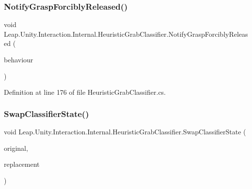 \mbox{\label{class_leap_1_1_unity_1_1_interaction_1_1_internal_1_1_heuristic_grab_classifier_a9c2b9020038d2087dd78e9c4ccdbfcdb}} 
\subsubsection{\texorpdfstring{NotifyGraspForciblyReleased()}{NotifyGraspForciblyReleased()}}
{\footnotesize\ttfamily void Leap.\+Unity.\+Interaction.\+Internal.\+Heuristic\+Grab\+Classifier.\+Notify\+Grasp\+Forcibly\+Released (\begin{DoxyParamCaption}\item[{\mbox{\hyperlink{interface_leap_1_1_unity_1_1_interaction_1_1_i_interaction_behaviour}{I\+Interaction\+Behaviour}}}]{behaviour }\end{DoxyParamCaption})}



Definition at line 176 of file Heuristic\+Grab\+Classifier.\+cs.

\mbox{\label{class_leap_1_1_unity_1_1_interaction_1_1_internal_1_1_heuristic_grab_classifier_a475f3bc02d1c3649d24ee266e2221c3b}} 
\subsubsection{\texorpdfstring{SwapClassifierState()}{SwapClassifierState()}}
{\footnotesize\ttfamily void Leap.\+Unity.\+Interaction.\+Internal.\+Heuristic\+Grab\+Classifier.\+Swap\+Classifier\+State (\begin{DoxyParamCaption}\item[{\mbox{\hyperlink{interface_leap_1_1_unity_1_1_interaction_1_1_i_interaction_behaviour}{I\+Interaction\+Behaviour}}}]{original,  }\item[{\mbox{\hyperlink{interface_leap_1_1_unity_1_1_interaction_1_1_i_interaction_behaviour}{I\+Interaction\+Behaviour}}}]{replacement }\end{DoxyParamCaption})}



